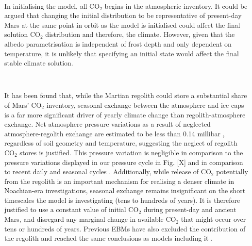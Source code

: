 \documentclass[12pt,onecolumn]{revtex4-2}    %
\begin{document}
\

In initialising the model, all $\mathrm{CO_2}$ begins in the atmospheric inventory. It could be argued that changing the initial distribution to be representative of present-day Mars at the same point in orbit as the model is initialised could affect the final solution $\mathrm{CO_2}$ distribution and therefore, the climate. However, given that the albedo parametrisation is independent of frost depth and only dependent on temperature, it is unlikely that specifying an initial state would affect the final stable climate solution.

\

It has been found that, while the Martian regolith could store a substantial share of Mars' $\mathrm{CO_2}$ inventory, seasonal exchange between the atmosphere and ice caps is a far more significant driver of yearly climate change than regolith-atmosphere exchange. Net atmosphere pressure variations as a result of neglected atmosphere-regolith exchange are estimated to be less than 0.14 millibar \cite{FBSJS82}, regardless of soil geometry and temperature, suggesting the neglect of regolith $\mathrm{CO_2}$ stores is justified. This pressure variation is negligible in comparison to the pressure variations displayed in our pressure cycle in Fig. [X] and in comparison to recent daily and seasonal cycles \cite{H24}. Additionally, while release of $\mathrm{CO_2}$ potentially from the regolith is an important mechanism for realising a denser climate in Noachian-era investigations, seasonal exchange remains insignificant on the short timescales the model is investigating (tens to hundreds of years). It is therefore justified to use a constant value of initial $\mathrm{CO_2}$ during present-day and ancient Mars, and disregard any marginal change in available $\mathrm{CO_2}$ that might occur over tens or hundreds of years.
Previous EBMs have also excluded the contribution of the regolith and reached the same conclusions as models including it \cite{NT01}.

\
\end{document}
